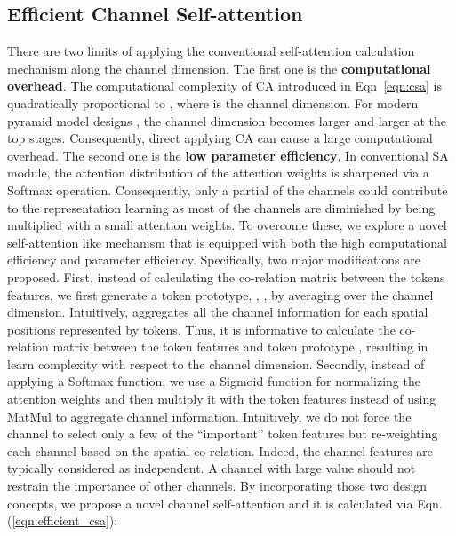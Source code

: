 \documentclass[nohyperref]{article}
\theoremstyle{plain}
\theoremstyle{definition}
\theoremstyle{remark}
\begin{document}
\subsection{Efficient Channel Self-attention} There are two limits of applying the conventional self-attention calculation mechanism along the channel dimension. The first one is the \textbf{computational overhead}. 
The computational complexity of CA introduced in Eqn~\ref{eqn:csa} is quadratically proportional to , where  is the channel dimension. For modern pyramid model designs \cite{wang2021pyramid, liu2021swin}, the channel dimension becomes larger and larger at the top stages. Consequently, direct applying CA can cause a large computational overhead. 
The second one is the {\bf low parameter efficiency}. In conventional SA module, the attention distribution of the attention weights is sharpened via a Softmax operation. Consequently, only a partial of the channels could contribute to the representation learning as most of the channels are diminished by being multiplied with a small attention weights.
To overcome these, we explore a novel self-attention like mechanism that is equipped with both the high computational efficiency and parameter efficiency.
Specifically, two major modifications are proposed. First, instead of calculating the co-relation matrix between the tokens features, we first generate a token prototype, ,   , by averaging over the channel dimension. Intuitively,  aggregates all the channel information for each spatial positions represented by tokens. Thus, it is informative to calculate the co-relation matrix between the token features and token prototype , resulting in learn complexity with respect to the channel dimension.
Secondly, instead of applying a Softmax function, we use a Sigmoid function for normalizing the attention weights and then multiply it with the token features instead of using MatMul to aggregate channel information. Intuitively, we do not force the channel to select only a few of the ``important'' token features but re-weighting each channel based on the spatial co-relation. Indeed, the channel features are typically considered as independent. A channel with large value should not restrain the importance of other channels.
By incorporating those two design concepts, we propose a novel channel self-attention and it is calculated via Eqn. (\ref{eqn:efficient_csa}):

\vspace{-0.4cm}
\begin{small}

\end{small}
\vspace{-0.1cm}
\end{document}
